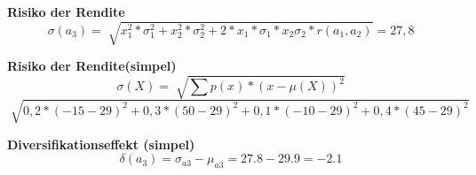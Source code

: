 \documentclass[11pt,twocolumn,fleqn]{article}
\begin{document}
\textbf{Risiko der Rendite}
\begin{equation*}
\sigma(a_3) = \sqrt[]{x^2_1 * \sigma^2_1 + x^2_2 * \sigma^2_2 + 2 * x_1 * \sigma_1 * x_2 \sigma_2 * r (a_1,a_2) } = 27,8
\end{equation*}

\textbf{Risiko der Rendite(simpel)}
\begin{equation*}
\sigma(X)= \sqrt[]{\sum p(x)*(x - \mu(X))^2}
\end{equation*}
\begin{equation*}
\sqrt[]{0,2*(-15-29)^2 + 0,3 * (50-29)^2 + 0,1 * (-10-29)^2 + 0,4 * (45-29)^2 }
\end{equation*}

\textbf{Diversifikationseffekt (simpel)}
\begin{equation*}
\delta(a_3)=\sigma_{a3}-\mu_{a3} = 27.8 - 29.9 = -2.1
\end{equation*}
\end{document}
